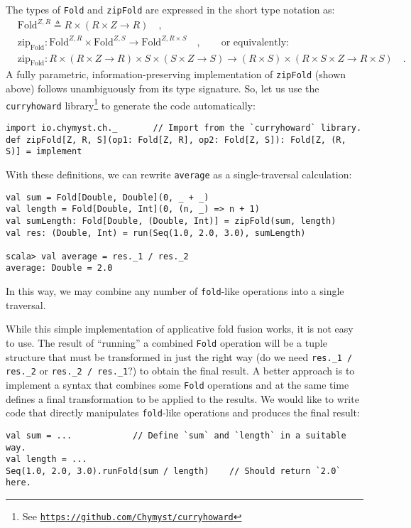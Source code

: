 The types of \lstinline!Fold! and \lstinline!zipFold! are expressed
in the short type notation as:
\begin{align*}
 & \text{Fold}^{Z,R}\triangleq R\times\left(R\times Z\rightarrow R\right)\quad,\\
 & \text{zip}_{\text{Fold}}:\text{Fold}^{Z,R}\times\text{Fold}^{Z,S}\rightarrow\text{Fold}^{Z,R\times S}\quad,\quad\quad\text{or equivalently:}\\
 & \text{zip}_{\text{Fold}}:R\times\left(R\times Z\rightarrow R\right)\times S\times\left(S\times Z\rightarrow S\right)\rightarrow\left(R\times S\right)\times(R\times S\times Z\rightarrow R\times S)\quad.
\end{align*}
A fully parametric, information-preserving implementation of \lstinline!zipFold!
(shown above) follows unambiguously from its type signature. So, let
us use the \lstinline!curryhoward!
library\footnote{See \texttt{\href{https://github.com/Chymyst/curryhoward}{https://github.com/Chymyst/curryhoward}}}
to generate the code automatically:
\begin{lstlisting}
import io.chymyst.ch._       // Import from the `curryhoward` library.
def zipFold[Z, R, S](op1: Fold[Z, R], op2: Fold[Z, S]): Fold[Z, (R, S)] = implement
\end{lstlisting}

With these definitions, we can rewrite \lstinline!average! as a single-traversal
calculation:
\begin{lstlisting}
val sum = Fold[Double, Double](0, _ + _)
val length = Fold[Double, Int](0, (n, _) => n + 1)
val sumLength: Fold[Double, (Double, Int)] = zipFold(sum, length)
val res: (Double, Int) = run(Seq(1.0, 2.0, 3.0), sumLength)

scala> val average = res._1 / res._2
average: Double = 2.0
\end{lstlisting}
In this way, we may combine any number of \lstinline!fold!-like operations
into a single traversal. 

While this simple implementation of applicative fold fusion works,
it is not easy to use. The result of \textsf{``}running\textsf{''} a combined \lstinline!Fold!
operation will be a tuple structure that must be transformed in just
the right way (do we need \lstinline!res._1 / res._2! or \lstinline!res._2 / res._1!?)
to obtain the final result. A better approach is to implement a syntax
that combines some \lstinline!Fold! operations and at the same time
defines a final transformation to be applied to the results. We would
like to write code that directly manipulates \lstinline!fold!-like
operations and produces the final result:
\begin{lstlisting}
val sum = ...            // Define `sum` and `length` in a suitable way.
val length = ...
Seq(1.0, 2.0, 3.0).runFold(sum / length)    // Should return `2.0` here.
\end{lstlisting}

